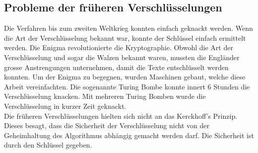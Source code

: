 \subsection{Probleme der früheren Verschlüsselungen}
Die Verfahren bis zum zweiten Weltkrieg konnten einfach geknackt werden. Wenn die Art der Verschlüsselung bekannt war, konnte der Schlüssel einfach ermittelt werden. 
Die Enigma revolutionierte die Kryptographie. Obwohl die Art der Verschlüsselung und sogar die Walzen bekannt waren, mussten die Engländer grosse Anstrengungen unternehmen, damit die Texte entschlüsselt werden konnten. Um der Enigma zu begegnen, wurden Maschinen gebaut, welche diese Arbeit vereinfachten. Die sogenannte Turing Bombe konnte innert 6 Stunden die Verschlüsselung knacken. 
Mit mehreren Turing Bomben wurde die Verschlüsselung in kurzer Zeit geknackt. \\[2ex]
%
Die früheren Verschlüsselungen hielten sich nicht an das Kerckhoff's Prinzip. Dieses besagt, dass die Sicherheit der Verschlüsselung nicht von der Geheimhaltung des Algorithmus abhängig gemacht werden darf. Die Sicherheit ist durch den Schlüssel gegeben. \cite{kerckhoffsprinzip}
%
